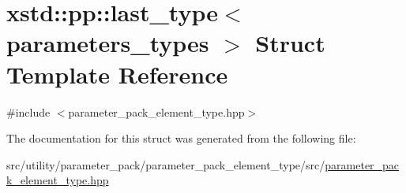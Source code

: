 \hypertarget{structxstd_1_1pp_1_1last__type}{\section{xstd\-:\-:pp\-:\-:last\-\_\-type$<$ parameters\-\_\-types $>$ Struct Template Reference}
\label{structxstd_1_1pp_1_1last__type}
}


{\ttfamily \#include $<$parameter\-\_\-pack\-\_\-element\-\_\-type.\-hpp$>$}



The documentation for this struct was generated from the following file\-:\begin{DoxyCompactItemize}
\item 
src/utility/parameter\-\_\-pack/parameter\-\_\-pack\-\_\-element\-\_\-type/src/\hyperlink{parameter__pack__element__type_8hpp}{parameter\-\_\-pack\-\_\-element\-\_\-type.\-hpp}\end{DoxyCompactItemize}
